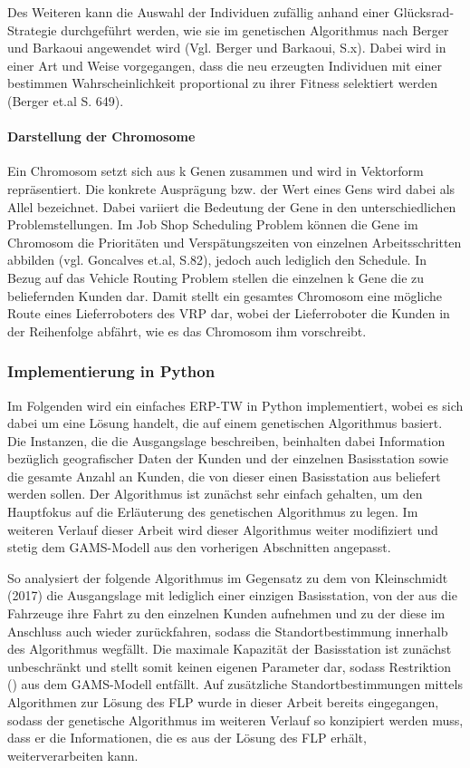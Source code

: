 \documentclass[a4paper,12pt,parskip,bibtotoc,liststotoc]{article}
\begin{document}
Des Weiteren kann die Auswahl der Individuen zufällig anhand einer Glücksrad-Strategie durchgeführt werden, wie sie im genetischen Algorithmus nach Berger und Barkaoui angewendet wird (Vgl. Berger und Barkaoui, S.x).
Dabei wird in einer Art und Weise vorgegangen, dass die neu erzeugten Individuen mit einer bestimmen Wahrscheinlichkeit proportional zu ihrer Fitness selektiert werden (Berger et.al S. 649).


\paragraph{Darstellung der Chromosome}

Ein Chromosom setzt sich aus k Genen zusammen und wird in Vektorform repräsentiert. 
Die konkrete Ausprägung bzw. der Wert eines Gens wird dabei als Allel bezeichnet.
Dabei variiert die Bedeutung der Gene in den unterschiedlichen Problemstellungen. 
Im Job Shop Scheduling Problem können die Gene im Chromosom die Prioritäten und Verspätungszeiten von einzelnen Arbeitsschritten abbilden (vgl. Goncalves et.al, S.82), jedoch auch lediglich den Schedule.
In Bezug auf das Vehicle Routing Problem stellen die einzelnen k Gene die zu beliefernden Kunden dar. 
Damit stellt ein gesamtes Chromosom eine mögliche Route eines Lieferroboters des VRP dar, wobei der Lieferroboter die Kunden in der Reihenfolge abfährt, wie es das Chromosom ihm vorschreibt. 


\subsubsection{Implementierung in Python}

Im Folgenden wird ein einfaches ERP-TW in Python implementiert, wobei es sich dabei um eine Lösung handelt, die auf einem genetischen Algorithmus basiert. 
Die Instanzen, die die Ausgangslage beschreiben, beinhalten dabei Information bezüglich geografischer Daten der Kunden und der einzelnen Basisstation sowie die gesamte Anzahl an Kunden, die von dieser einen Basisstation aus beliefert werden sollen.
Der Algorithmus ist zunächst sehr einfach gehalten, um den Hauptfokus auf die Erläuterung des genetischen Algorithmus zu legen. 
Im weiteren Verlauf dieser Arbeit wird dieser Algorithmus weiter modifiziert und stetig dem GAMS-Modell aus den vorherigen Abschnitten angepasst.

So analysiert der folgende Algorithmus im Gegensatz zu dem von Kleinschmidt (2017) die Ausgangslage mit lediglich einer einzigen Basisstation, von der aus die Fahrzeuge ihre Fahrt zu den einzelnen Kunden aufnehmen und zu der diese im Anschluss auch wieder zurückfahren, sodass die Standortbestimmung innerhalb des Algorithmus wegfällt.
Die maximale Kapazität der Basisstation ist zunächst unbeschränkt und stellt somit keinen eigenen Parameter dar, sodass Restriktion () aus dem GAMS-Modell entfällt. 
Auf zusätzliche Standortbestimmungen mittels Algorithmen zur Lösung des FLP wurde in dieser Arbeit bereits eingegangen, sodass der genetische Algorithmus im weiteren Verlauf so konzipiert werden muss, dass er die Informationen, die es aus der Lösung des FLP erhält, weiterverarbeiten kann.
\end{document}
